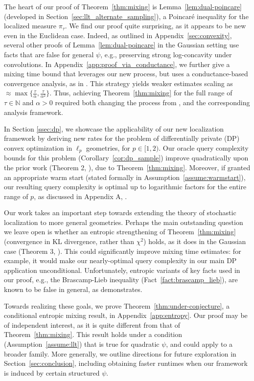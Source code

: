 \documentclass[11pt]{article}
\newcommand{\N}{\mathbb{N}}
\newcommand{\0}{\mathbf{0}}
\newcommand{\1}{\mathbf{1}}
\begin{document}
The heart of our proof of Theorem~\ref{thm:mixing} is Lemma~\ref{lem:dual-poincare} (developed in Section~\ref{sec:llt_alternate_sampling}), a Poincar\'e inequality for the localized measure $\pi_\tau$. We find our proof quite surprising, as it appears to be new even in the Euclidean case. Indeed, as outlined in Appendix~\ref{sec:convexity}, several other proofs of Lemma~\ref{lem:dual-poincare} in the Gaussian setting use facts that are false for general $\psi$, e.g., preserving strong log-concavity under convolutions. In Appendix~\ref{app:proof_via_conductance}, we further give a mixing time bound that leverages our new process, but uses a conductance-based convergence analysis, as in \cite{GopiLLST25}. This strategy yields weaker estimates scaling as $\approx \max\{\frac \tau \alpha, \frac \tau {\alpha^2}\}$. Thus, achieving Theorem~\ref{thm:mixing} for the full range of $\tau \in \N$ and $\alpha > 0$ required both changing the process from \cite{GopiLLST25}, and the corresponding analysis framework.


In Section \ref{ssec:dp}, we showcase the applicability of our new localization framework by deriving new rates for the problem of differentially private (DP) convex optimization in $\ell_p$ geometries, for $p \in [1, 2)$. Our oracle query complexity bounds for this problem (Corollary~\ref{cor:dp_sample}) improve quadratically upon the prior work (Theorem 2, \cite{GopiLLST25}), due to Theorem~\ref{thm:mixing}. Moreover, if granted an appropriate warm start (stated formally in Assumption~\ref{assume:warmstart}), our resulting query complexity is optimal up to logarithmic factors for the entire range of $p$, as discussed in Appendix A, \cite{GopiLLST25}.

Our work takes an important step towards extending the theory of stochastic localization to more general geometries. Perhaps the main outstanding question we leave open is whether an entropic strengthening of Theorem~\ref{thm:mixing} (convergence in KL divergence, rather than $\chi^2$) holds, as it does in the Gaussian case (Theorem 3, \cite{ChenCSW22}). This could significantly improve mixing time estimates: for example, it would make our nearly-optimal query complexity in our main DP application unconditional. Unfortunately, entropic variants of key facts used in our proof, e.g., the Brascamp-Lieb inequality (Fact~\ref{fact:brascamp_lieb}), are known to be false in general, as \cite{BobkovL00} demonstrates.

Towards realizing these goals, we prove Theorem~\ref{thm:under-conjecture}, a conditional entropic mixing result, in Appendix~\ref{app:entropy}. Our proof may be of independent interest, as it is quite different from that of Theorem~\ref{thm:mixing}. This result holds under a condition (Assumption~\ref{assume:llt}) that is true for quadratic $\psi$, and could apply to a broader family. More generally, we outline directions for future exploration in Section~\ref{sec:conclusion}, including obtaining faster runtimes when our framework is induced by certain structured $\psi$.
\end{document}
